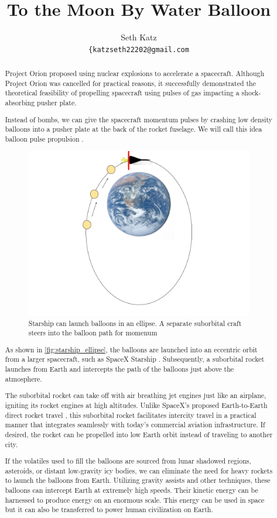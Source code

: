 \documentclass{article}
\title{To the Moon By Water Balloon}
\author{
  Seth Katz \\
  \texttt{\{katzseth22202@gmail.com} \\
}
\begin{document}
\maketitle


\begin{abstract}
    Project Orion \cite{projorion} proposed using nuclear explosions to accelerate a spacecraft.  Although Project Orion was cancelled for practical reasons,  it successfully demonstrated the theoretical feasibility of propelling spacecraft using pulses of gas impacting a shock-absorbing pusher plate.

    Instead of bombs, we can give the spacecraft momentum pulses by crashing low density balloons into a pusher plate at the back of the rocket fuselage.  We will call this idea balloon pulse propulsion \cite{aim2024}.
 \begin{figure}[h]
    \centering
    \includegraphics[width=0.5\linewidth]{images/Starship_Impact_ellipse.png}
    \caption{Starship can launch balloons in an ellipse.   A separate suborbital craft steers into the balloon path for momenum}
    \label{fig:starship_ellipse}
\end{figure}

As shown in \autoref{fig:starship_ellipse}, the balloons are launched into an eccentric orbit from a larger spacecraft, such as SpaceX Starship \cite{starship}.   Subsequently, a suborbital rocket launches from Earth and intercepts the path of the balloons just above the atmosphere.    

The suborbital rocket can take off with air breathing jet engines just like an airplane, igniting its rocket engines at high altitudes. Unlike SpaceX’s proposed Earth-to-Earth direct rocket travel \cite{spacex_earth_earth}, this suborbital rocket facilitates intercity travel in a practical manner that integrates seamlessly with today’s commercial aviation infrastructure. If desired, the rocket can be propelled into low Earth orbit instead of traveling to another city.

If the volatiles used to fill the balloons are sourced from lunar shadowed regions, asteroids, or distant low-gravity icy bodies, we can eliminate the need for heavy rockets to launch the balloons from Earth. Utilizing gravity assists and other techniques, these balloons can intercept Earth at extremely high speeds. Their kinetic energy can be harnessed to produce energy on an enormous scale.   This energy can be used in space but it can also be transferred to power human civilization on Earth.


\end{abstract}
\end{document}
